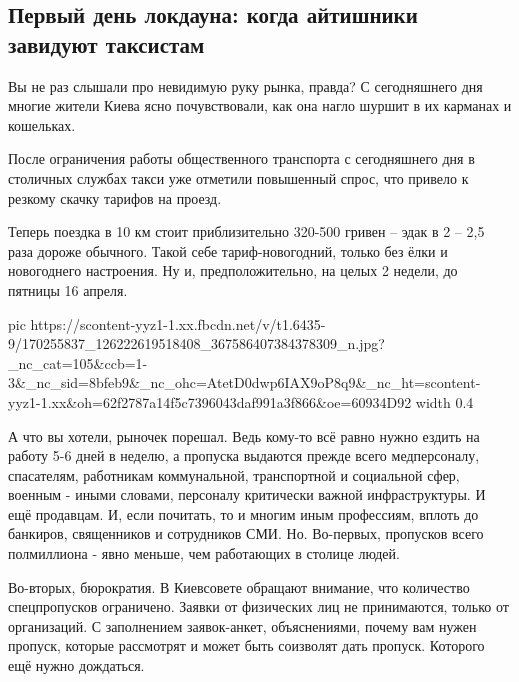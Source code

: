  
 
 
 
 

\subsection{Первый день локдауна: когда айтишники завидуют таксистам }
\label{sec:06_04_2021.fb.zharkih_ekaterina.1.taksi_karantin_it}

Вы не раз слышали про невидимую руку рынка, правда? С сегодняшнего дня многие
жители Киева ясно почувствовали, как она нагло шуршит в их карманах и
кошельках.   

После ограничения работы общественного транспорта с сегодняшнего дня в
столичных службах такси уже отметили повышенный спрос, что привело к резкому
скачку тарифов на проезд. 

Теперь поездка в 10 км стоит приблизительно 320-500 гривен – эдак в 2 – 2,5
раза дороже обычного. Такой себе тариф-новогодний, только без ёлки и
новогоднего настроения. Ну и, предположительно, на целых 2 недели, до пятницы
16 апреля.


\ifcmt
  pic https://scontent-yyz1-1.xx.fbcdn.net/v/t1.6435-9/170255837_126222619518408_367586407384378309_n.jpg?_nc_cat=105&ccb=1-3&_nc_sid=8bfeb9&_nc_ohc=AtetD0dwp6IAX9oP8q9&_nc_ht=scontent-yyz1-1.xx&oh=62f2787a14f5c7396043daf991a3f866&oe=60934D92
  width 0.4
\fi


А что вы хотели, рыночек порешал. Ведь кому-то всё равно нужно ездить на работу
5-6 дней в неделю, а пропуска выдаются прежде всего медперсоналу, спасателям,
работникам коммунальной, транспортной и социальной сфер, военным - иными
словами, персоналу критически важной инфраструктуры. И ещё продавцам. И, если
почитать, то и многим иным профессиям, вплоть до банкиров, священников и
сотрудников СМИ. Но. Во-первых, пропусков всего полмиллиона -  явно меньше, чем
работающих в столице людей. 

Во-вторых, бюрократия. В Киевсовете обращают внимание, что количество
спецпропусков ограничено. Заявки от физических лиц не принимаются, только от
организаций. С заполнением заявок-анкет, объяснениями, почему вам нужен
пропуск, которые рассмотрят и может быть соизволят дать пропуск. Которого ещё
нужно дождаться. 

